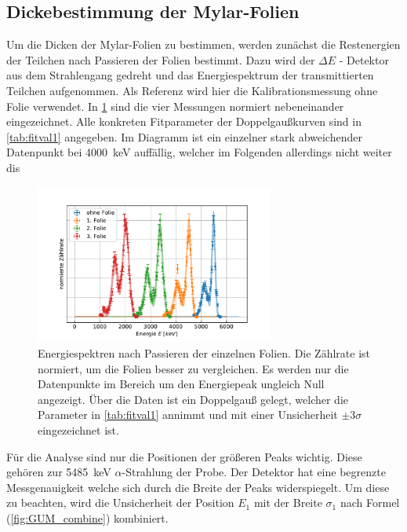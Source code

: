 \subsection{Dickebestimmung der Mylar-Folien}
\label{sec:dicke}

Um die Dicken der Mylar-Folien zu bestimmen, werden zunächst die Restenergien der Teilchen nach Passieren der Folien bestimmt.
Dazu wird der $\Delta E$ - Detektor aus dem Strahlengang gedreht und das Energiespektrum der transmittierten Teilchen aufgenommen.
Als Referenz wird hier die Kalibrationsmessung ohne Folie verwendet.
In \cref{fig:foliendicke} sind die vier Messungen normiert nebeneinander eingezeichnet.
Alle konkreten Fitparameter der Doppelgaußkurven sind in \cref{tab:fitval1} angegeben.
Im Diagramm ist ein einzelner stark abweichender Datenpunkt bei \SI{4000}{\kilo\electronvolt} auffällig, welcher im Folgenden allerdings nicht weiter dis

\begin{figure}[ht]
	\centering
	\includegraphics[width=0.7\textwidth]{dat/m3_foliendicke.pdf}
	\caption{Energiespektren nach Passieren der einzelnen Folien.
			Die Zählrate ist normiert, um die Folien besser zu vergleichen.
			Es werden nur die Datenpunkte im Bereich um den Energiepeak ungleich Null angezeigt.
			Über die Daten ist ein Doppelgauß gelegt, welcher die Parameter in \cref{tab:fitval1} annimmt und mit einer Unsicherheit $\pm 3 \sigma$ eingezeichnet ist.}
	\label{fig:foliendicke}
\end{figure}

Für die Analyse sind nur die Positionen der größeren Peaks wichtig.
Diese gehören zur \SI{5485}{\kilo\electronvolt} $\alpha$-Strahlung der Probe.
Der Detektor hat eine begrenzte Messgenauigkeit welche sich durch die Breite der Peaks widerspiegelt.
Um diese zu beachten, wird die Unsicherheit der Position $E_1$ mit der Breite $\sigma_1$ nach Formel (\ref{fig:GUM_combine}) kombiniert.

